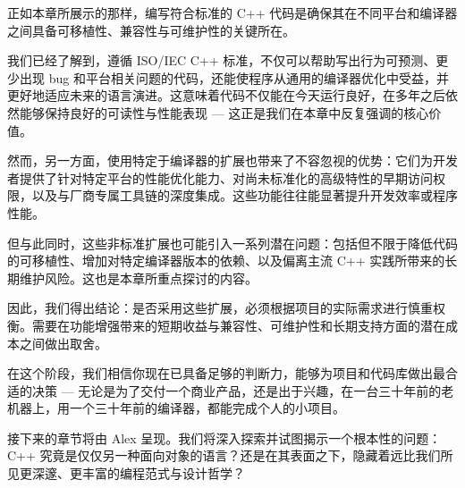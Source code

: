 正如本章所展示的那样，编写符合标准的 C++ 代码是确保其在不同平台和编译器之间具备可移植性、兼容性与可维护性的关键所在。

我们已经了解到，遵循 ISO/IEC C++ 标准，不仅可以帮助写出行为可预测、更少出现 bug 和平台相关问题的代码，还能使程序从通用的编译器优化中受益，并更好地适应未来的语言演进。这意味着代码不仅能在今天运行良好，在多年之后依然能够保持良好的可读性与性能表现 --- 这正是我们在本章中反复强调的核心价值。

然而，另一方面，使用特定于编译器的扩展也带来了不容忽视的优势：它们为开发者提供了针对特定平台的性能优化能力、对尚未标准化的高级特性的早期访问权限，以及与厂商专属工具链的深度集成。这些功能往往能显著提升开发效率或程序性能。

但与此同时，这些非标准扩展也可能引入一系列潜在问题：包括但不限于降低代码的可移植性、增加对特定编译器版本的依赖、以及偏离主流 C++ 实践所带来的长期维护风险。这也是本章所重点探讨的内容。

因此，我们得出结论：是否采用这些扩展，必须根据项目的实际需求进行慎重权衡。需要在功能增强带来的短期收益与兼容性、可维护性和长期支持方面的潜在成本之间做出取舍。

在这个阶段，我们相信你现在已具备足够的判断力，能够为项目和代码库做出最合适的决策 --- 无论是为了交付一个商业产品，还是出于兴趣，在一台三十年前的老机器上，用一个三十年前的编译器，都能完成个人的小项目。

接下来的章节将由 Alex 呈现。我们将深入探索并试图揭示一个根本性的问题：C++ 究竟是仅仅另一种面向对象的语言？还是在其表面之下，隐藏着远比我们所见更深邃、更丰富的编程范式与设计哲学？